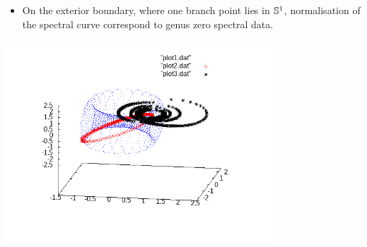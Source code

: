\documentclass[xcolor=dvipsnames]{beamer}
\begin{document}
\begin{frame}
\begin{itemize}
\item On the exterior boundary, where one branch point lies in $\S^1$, normalisation of the spectral curve correspond to genus zero spectral data.
\end{itemize}
\begin{center}
\includegraphics[width=100mm]{boundaryLink.png}
\end{center}
\end{frame}
\end{document}
